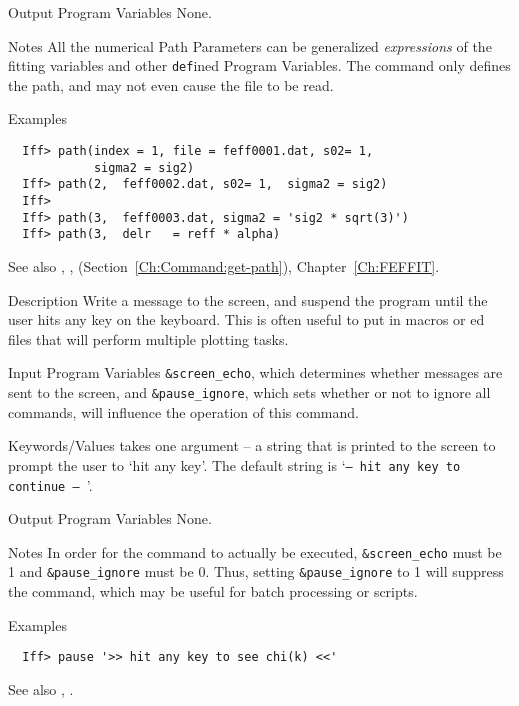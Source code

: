 \begin{IFFcom}
\item[Output Program Variables]  None.
  
\item[Notes] All the numerical Path Parameters can be generalized
  {\emph{expressions}} of the fitting variables and other {\tt{def}}ined
  Program Variables.  The  command only defines the path, and
  may not even cause the {\feffndat} file to be read.

  
\item[Examples] {\hspace{1.in} \vspace{-0.1truein} \relax }
\begin{verbatim} 
  Iff> path(index = 1, file = feff0001.dat, s02= 1, 
            sigma2 = sig2)
  Iff> path(2,  feff0002.dat, s02= 1,  sigma2 = sig2)
  Iff> 
  Iff> path(3,  feff0003.dat, sigma2 = 'sig2 * sqrt(3)')
  Iff> path(3,  delr   = reff * alpha)
\end{verbatim} \noindent %
\item[See also] {}, {},
{} (Section~\ref{Ch:Command:get-path}), 
  Chapter~{\ref{Ch:FEFFIT}}. 
\end{IFFcom}



\begin{IFFcom}
\item[Description] Write a message to the screen, and suspend the program
  until the user hits any key on the keyboard.  This is often useful to put
  in macros or {}ed files that will perform multiple   plotting
  tasks.  
\item[Input Program Variables] {\tt{\&screen\_echo}}, which determines
  whether messages are sent to the screen, and {\tt{\&pause\_ignore}},
  which sets whether or not to ignore all {} commands, will
  influence the operation of this command.
\item[Keywords/Values] {} takes one argument -- a string that
  is printed to the screen to prompt the user to `hit any key'.  The
  default string is `{\texttt{-- hit any key to continue -- }}'.
\item[Output Program Variables] None.
\item[Notes] In order for the {} command to actually be
  executed, {\tt{\&screen\_echo}} must be 1 and {\tt{\&pause\_ignore}} must
  be 0.  Thus, setting {\tt{\&pause\_ignore}} to 1 will suppress the
  command, which may be useful for batch processing or scripts.
\item[Examples] {\hspace{1.in} \vspace{-0.1truein} \relax }
\begin{verbatim} 
  Iff> pause '>> hit any key to see chi(k) <<'
\end{verbatim} \noindent %
\item[See also] {}, {}.
\end{IFFcom}


